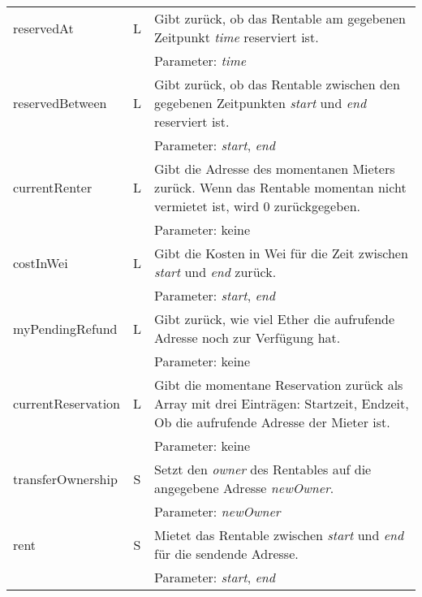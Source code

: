 \begin{longtable}{@{}lcL{9cm}@{}}
\\\midrule
reservedAt          & L   & Gibt zurück, ob das Rentable am gegebenen Zeitpunkt \emph{time} reserviert ist.\\ & & Parameter: \emph{time}                                                                                                                       \\\midrule
reservedBetween     & L   & Gibt zurück, ob das Rentable zwischen den gegebenen Zeitpunkten \emph{start} und \emph{end} reserviert ist.\\ & & Parameter: \emph{start}, \emph{end}                                                                                                          \\\midrule
currentRenter       & L   & Gibt die Adresse des momentanen Mieters zurück. Wenn das Rentable momentan nicht vermietet ist, wird 0 zurückgegeben.\\ & & Parameter: keine                                                                                      \\\midrule
costInWei           & L   & Gibt die Kosten in Wei für die Zeit zwischen \emph{start} und \emph{end} zurück.\\ & & Parameter: \emph{start}, \emph{end}                                                                                                                       \\\midrule
myPendingRefund     & L   & Gibt zurück, wie viel Ether die aufrufende Adresse noch zur Verfügung hat.\\ & & Parameter: keine                                                                                                                      \\ \midrule
currentReservation  & L   & Gibt die momentane Reservation zurück als Array mit drei Einträgen: Startzeit, Endzeit, Ob die aufrufende Adresse der Mieter ist.\\ & & Parameter: keine                                                             \\\midrule
transferOwnership   & S   & Setzt den \emph{owner} des Rentables auf die angegebene Adresse \emph{newOwner}.\\ & & Parameter: \emph{newOwner}                                                                                                                         \\\midrule
rent                & S   & Mietet das Rentable zwischen \emph{start} und \emph{end} für die sendende Adresse.\\ & & Parameter: \emph{start}, \emph{end}                                                                                                                     \\\midrule

\end{longtable}
